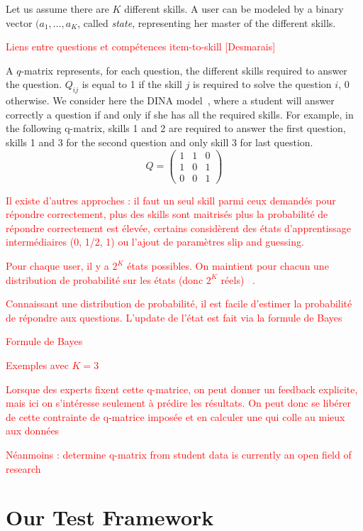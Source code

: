 \documentclass{sig-alternate}
\newcommand\alert[1]{\textcolor{red}{#1}}
\begin{document}
Let us assume there are $K$ different skills. A user can be modeled by a binary vector $(a_1, \ldots, a_K$, called \emph{state}, representing her master of the different skills. 

\alert{Liens entre questions et compétences item-to-skill [Desmarais]}

A $q$-matrix \cite{Tatsuoka1983} represents, for each question, the different skills required to answer the question. $Q_{ij}$ is equal to 1 if the skill $j$ is required to solve the question $i$, 0 otherwise. We consider here the DINA model~\cite{Desmarais2012}, where a student will answer correctly a question if and only if she has all the required skills. For example, in the following q-matrix, skills 1 and 2 are required to answer the first question, skills 1 and 3 for the second question and only skill 3 for last question. %
\[ Q = \left(\begin{array}{lll}
1 & 1 & 0\\
1 & 0 & 1\\
0 & 0 & 1
\end{array}\right) \]

\alert{Il existe d'autres approches : il faut un seul skill parmi ceux demandés pour répondre correctement, plus des skills sont maitrisés plus la probabilité de répondre correctement est élevée, certains considèrent des états d'apprentissage intermédiaires (0, 1/2, 1) ou l'ajout de paramètres slip and guessing. }

\alert{Pour chaque user, il y a $2^K$ états possibles. On maintient pour chacun une distribution de probabilité sur les états (donc $2^K$ réels) ~\cite{Huebner2010}.}

\alert{Connaissant une distribution de probabilité, il est facile d'estimer la probabilité de répondre aux questions. L'update de l'état est fait via la formule de Bayes}

\alert{Formule de Bayes}

\alert{Exemples avec $K = 3$}

\alert{Lorsque des experts fixent cette q-matrice, on peut donner un feedback explicite, mais ici on s'intéresse seulement à prédire les résultats. On peut donc se libérer de cette contrainte de q-matrice imposée et en calculer une qui colle au mieux aux données}

\alert{Néanmoins : determine q-matrix from student data is currently an open field of research}

\section{Our Test Framework}
\end{document}
